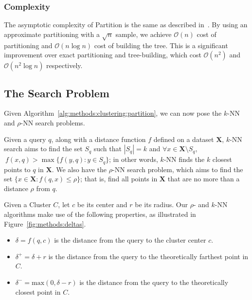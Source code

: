 \subsubsection {Complexity}
\label{subsubsec:methods:clustering:clustering:complexity}

The asymptotic complexity of Partition is the same as described in~\cite{ishaq2019clustered}.
By using an approximate partitioning with a $\sqrt{n}$ sample, we achieve $\mathcal{O}(n)$ cost of partitioning and $\mathcal{O}(n \log n)$ cost of building the tree.
This is a significant improvement over exact partitioning and tree-building, which cost $\mathcal{O}(n^2)$ and $\mathcal{O}(n^2 \log n)$ respectively.


\subsection{The Search Problem}
\label{subsec:methods:the-search-problem}

Given Algorithm~\ref{alg:methods:clustering:partition}, we can now pose the $k$-NN and $\rho$-NN search problems.

Given a query $q$, along with a distance function $f$ defined on a dataset $\textbf{X}$, $k$-NN search aims to find the set $S_q$ such that $|S_q| = k$ and $\forall x \in \textbf{X} \setminus S_q$, $\ f(x, q) > \max\{f(y, q): y \in S_q \}$;
in other words, $k$-NN finds the $k$ closest points to $q$ in $\textbf{X}$.
We also have the $\rho$-NN search problem, which aims to find the set $\{x \in \textbf{X}: f(q, x) \leq \rho \}$;
that is, find all points in $\textbf{X}$ that are no more than a distance $\rho$ from $q$.

Given a Cluster $C$, let $c$ be its center and $r$ be its radius. Our $\rho$- and $k$-NN algorithms make use of the following properties, as illustrated in Figure~\ref{fig:methods:deltas}.

\begin{itemize}
    \item $\delta = f(q, c)$ is the distance from the query to the cluster center $c$.
    \item $\delta^{+} = \delta + r$ is the distance from the query to the theoretically farthest point in $C$.
    \item $\delta^{-} = \text{max}(0, \delta - r)$ is the distance from the query to the theoretically closest point in $C$.
\end{itemize}


